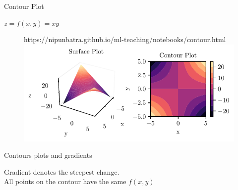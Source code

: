 \documentclass{beamer}
\begin{document}
\begin{frame}{Contour Plot}

$z = f(x,y) = xy$\\

\begin{figure}[htp]
	\centering
	\begin{notebookbox}{https://nipunbatra.github.io/ml-teaching/notebooks/contour.html}
	  \includegraphics[width=\linewidth]{../figures/mml/contour-x_times_y.pdf}
	\end{notebookbox}
  \end{figure}

\end{frame}









\begin{frame}{Contours plots and gradients}
    
    
    Gradient denotes the steepest change.\\
    All points on the contour have the same $f(x,y)$\\
    
    
\end{frame}
\end{document}
